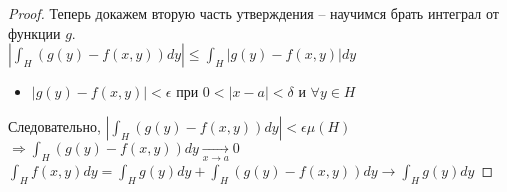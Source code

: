 \begin{proof}
    Теперь докажем вторую часть утверждения -- научимся брать интеграл от функции $g$.\\
    $\displaystyle \left|\int_{H} (g(y) - f(x, y))dy\right| \leqslant
    \int_{H} |g(y) - f(x, y)|dy$ 
    \begin{itemize}
        \item $ |g(y) - f(x, y)| < \epsilon$ при $ 0 < |x - a| < \delta$ и $\forall y \in H$
    \end{itemize}
    Следовательно, $\displaystyle \left|\int_{H} (g(y) - f(x, y))dy\right| < \epsilon \mu(H)$ \\
    $\displaystyle \Rightarrow \int_{H} (g(y) - f(x, y))dy \xrightarrow[x \to a]{} 0$ \\
    $\displaystyle \int_{H} f(x,y)dy = \int_{H} g(y)dy + \int_{H} (g(y) - f(x, y))dy 
    \to \int_{H} g(y)dy$ 
\end{proof}

